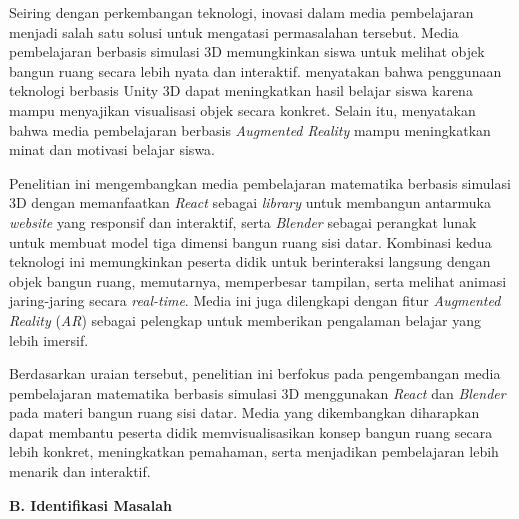 \hspace*{1cm}Seiring dengan perkembangan teknologi, inovasi dalam media pembelajaran menjadi salah satu solusi untuk mengatasi permasalahan tersebut. Media pembelajaran berbasis simulasi 3D memungkinkan siswa untuk melihat objek bangun ruang secara lebih nyata dan interaktif. \citet{hidayah2024} menyatakan bahwa penggunaan teknologi berbasis Unity 3D dapat meningkatkan hasil belajar siswa karena mampu menyajikan visualisasi objek secara konkret. Selain itu, \citet{setiawan2023} menyatakan bahwa media pembelajaran berbasis \textit{Augmented Reality} mampu meningkatkan minat dan motivasi belajar siswa.

\hspace*{1cm}Penelitian ini mengembangkan media pembelajaran matematika berbasis simulasi 3D dengan memanfaatkan \textit{React} sebagai \textit{library} untuk membangun antarmuka \textit{website} yang responsif dan interaktif, serta \textit{Blender} sebagai perangkat lunak untuk membuat model tiga dimensi bangun ruang sisi datar. Kombinasi kedua teknologi ini memungkinkan peserta didik untuk berinteraksi langsung dengan objek bangun ruang, memutarnya, memperbesar tampilan, serta melihat animasi jaring-jaring secara \textit{real-time}. Media ini juga dilengkapi dengan fitur \textit{Augmented Reality} (\textit{AR}) sebagai pelengkap untuk memberikan pengalaman belajar yang lebih imersif.

\hspace*{1cm}Berdasarkan uraian tersebut, penelitian ini berfokus pada pengembangan media pembelajaran matematika berbasis simulasi 3D menggunakan \textit{React} dan \textit{Blender} pada materi bangun ruang sisi datar. Media yang dikembangkan diharapkan dapat membantu peserta didik memvisualisasikan konsep bangun ruang secara lebih konkret, meningkatkan pemahaman, serta menjadikan pembelajaran lebih menarik dan interaktif.

\vspace{0.5cm}

\textbf{B. Identifikasi Masalah}

